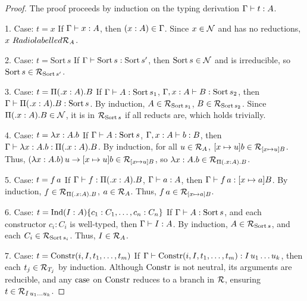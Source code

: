 \documentclass{article}
\begin{document}
\begin{proof}[Proof]
The proof proceeds by induction on the typing derivation \(\Gamma \vdash t : A\).

1. Case: \(t = x\)
   If \(\Gamma \vdash x : A\), then \((x : A) \in \Gamma\). Since \(x \in \mathcal{N}\)
   and has no reductions, \(x \ Radiolabelled{\mathcal{R}_A}\).

2. Case: \(t = \text{Sort} \, s\)
   If \(\Gamma \vdash \text{Sort} \, s : \text{Sort} \, s'\),
   then \(\text{Sort} \, s \in \mathcal{N}\) and is irreducible,
   so \(\text{Sort} \, s \in \mathcal{R}_{\text{Sort} \, s'}\).

3. Case: \(t = \Pi ( . x : A). B\)
   If \(\Gamma \vdash A : \text{Sort} \, s_1\),
     \(\Gamma, x : A \vdash B : \text{Sort} \, s_2\),
   then \(\Gamma \vdash \Pi ( . x : A). B : \text{Sort} \, s\).
   By induction, \(A \in \mathcal{R}_{\text{Sort} \, s_1}\),
   \(B \in \mathcal{R}_{\text{Sort} \, s_2}\).
   Since \(\Pi ( . x : A). B \in \mathcal{N}\),
   it is in \(\mathcal{R}_{\text{Sort} \, s}\)
   if all reducts are, which holds trivially.

4. Case: \(t = \lambda x : A . b\)
   If \(\Gamma \vdash A : \text{Sort} \, s\),
      \(\Gamma, x : A \vdash b : B\),
   then \(\Gamma \vdash \lambda x : A . b : \Pi ( . x : A). B\).
   By induction, for all \(u \in \mathcal{R}_A\),
   \([x \mapsto u] b \in \mathcal{R}_{[x \mapsto u] B}\).
   Thus, \((\lambda x : A . b) \, u \to [x \mapsto u] b \in \mathcal{R}_{[x \mapsto u] B}\),
   so \(\lambda x : A . b \in \mathcal{R}_{\Pi ( . x : A). B}\).

5. Case: \(t = f \, a\)
   If \(\Gamma \vdash f : \Pi ( . x : A). B\), \(\Gamma \vdash a : A\),
   then \(\Gamma \vdash f \, a : [x \mapsto a] B\).
   By induction, \(f \in \mathcal{R}_{\Pi ( . x : A). B}\), \(a \in \mathcal{R}_A\).
   Thus, \(f \, a \in \mathcal{R}_{[x \mapsto a] B}\).

6. Case: \(t = \text{Ind}(I : A)\{c_1 : C_1, \dots, c_n : C_n\}\)
   If \(\Gamma \vdash A : \text{Sort} \, s\), and each
   constructor \(c_i : C_i\) is well-typed, then \(\Gamma \vdash I : A\).
   By induction, \(A \in \mathcal{R}_{\text{Sort} \, s}\), and
   each \(C_i \in \mathcal{R}_{\text{Sort} \, s_i}\). Thus, \(I \in \mathcal{R}_A\).

7. Case: \(t = \text{Constr}(i, I, t_1, \dots, t_m)\)
   If \(\Gamma \vdash \text{Constr}(i, I, t_1, \dots, t_m) : I \, u_1 \dots u_k\),
   then each \(t_j \in \mathcal{R}_{T_j}\) by induction.
   Although \(\text{Constr}\) is not neutral, its arguments are reducible,
   and any \(\text{case}\) on \(\text{Constr}\) reduces to a branch in \(\mathcal{R}\),
   ensuring \(t \in \mathcal{R}_{I \, u_1 \dots u_k}\).


\end{proof}
\end{document}
